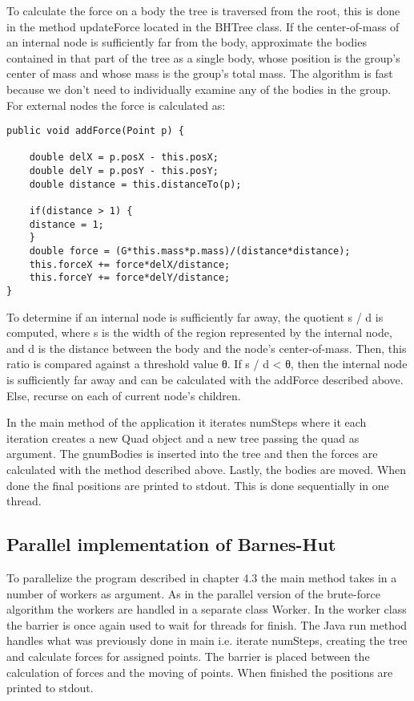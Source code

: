 \documentclass{article}
\begin{document}
To calculate the force on a body the tree is traversed from the root, this is done in the method updateForce located in the BHTree class. If the center-of-mass of an internal node is sufficiently far from the body, approximate the bodies contained in that part of the tree as a single body, whose position is the group’s center of mass and whose mass is the group’s total mass. The algorithm is fast because we don’t need to individually examine any of the bodies in the group. For external nodes the force is calculated as: 
\begin{verbatim} 
public void addForce(Point p) {         

    double delX = p.posX - this.posX;         
    double delY = p.posY - this.posY;         
    double distance = this.distanceTo(p);                  

    if(distance > 1) {            
    distance = 1;         
    }          
    double force = (G*this.mass*p.mass)/(distance*distance);         
    this.forceX += force*delX/distance;         
    this.forceY += force*delY/distance;     
}
\end{verbatim}
To determine if an internal node is sufficiently far away, the quotient s / d is computed, where s is the width of the region represented by the internal node, and d is the distance between the body and the node’s center-of-mass. Then, this ratio is compared against a threshold value θ. If s / d < θ, then the internal node is sufficiently far away and can be calculated with the addForce described above. Else, recurse on each of current node's children. 

In the main method of the application it iterates numSteps where it each iteration creates a new Quad object and a new tree passing the quad as argument. The gnumBodies is inserted into the tree and then the forces are calculated with the method described above. Lastly, the bodies are moved. When done the final positions are printed to stdout. This is done sequentially in one thread. 

\subsection{Parallel implementation of Barnes-Hut}

To parallelize the program described in chapter 4.3 the main method takes in a number of workers as argument. As in the parallel version of the brute-force algorithm the workers are handled in a separate class Worker. In the worker class the barrier is once again used to wait for threads for finish.  The Java run method handles what was previously done in main i.e. iterate numSteps, creating the tree and calculate forces for assigned points. The barrier is placed between the calculation of forces and the moving of points. When finished the positions are printed to stdout. 
\end{document}
